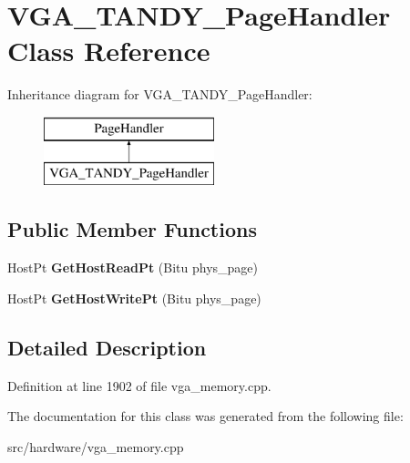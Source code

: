 \hypertarget{classVGA__TANDY__PageHandler}{\section{V\-G\-A\-\_\-\-T\-A\-N\-D\-Y\-\_\-\-Page\-Handler Class Reference}
\label{classVGA__TANDY__PageHandler}
}
Inheritance diagram for V\-G\-A\-\_\-\-T\-A\-N\-D\-Y\-\_\-\-Page\-Handler\-:\begin{figure}[H]
\begin{center}
\leavevmode
\includegraphics[height=2.000000cm]{classVGA__TANDY__PageHandler}
\end{center}
\end{figure}
\subsection*{Public Member Functions}
\begin{DoxyCompactItemize}
\item 
\hypertarget{classVGA__TANDY__PageHandler_a8c39c6f07a7c47fa66839f49dbac7585}{Host\-Pt {\bfseries Get\-Host\-Read\-Pt} (Bitu phys\-\_\-page)}\label{classVGA__TANDY__PageHandler_a8c39c6f07a7c47fa66839f49dbac7585}

\item 
\hypertarget{classVGA__TANDY__PageHandler_aa7f32d214017a07179bc6b8187028e69}{Host\-Pt {\bfseries Get\-Host\-Write\-Pt} (Bitu phys\-\_\-page)}\label{classVGA__TANDY__PageHandler_aa7f32d214017a07179bc6b8187028e69}

\end{DoxyCompactItemize}


\subsection{Detailed Description}


Definition at line 1902 of file vga\-\_\-memory.\-cpp.



The documentation for this class was generated from the following file\-:\begin{DoxyCompactItemize}
\item 
src/hardware/vga\-\_\-memory.\-cpp\end{DoxyCompactItemize}
